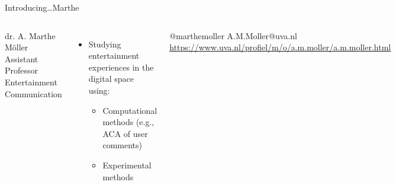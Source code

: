 \documentclass[handout]{beamer}
\begin{document}
\begin{frame}{Introducing\ldots \huge{Marthe}} 
	
	\begin{columns}
		dr. A. Marthe Möller \\
		Assistant Professor Entertainment Communication
		\begin{itemize}
			\item Studying entertainment experiences in the digital space using:
			\begin{itemize}
				\item Computational methods (e.g., ACA of user comments)
				\item Experimental methods
			\end{itemize}
		\end{itemize}
		@marthemoller \textbar A.M.Moller@uva.nl \textbar \url{https://www.uva.nl/profiel/m/o/a.m.moller/a.m.moller.html} 
	\end{columns}
\end{frame}
\end{document}
